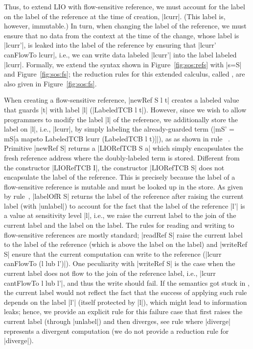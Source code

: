 Thus, to extend LIO with flow-sensitive reference, we must account for the label
on the label of the reference at the time of creation, |lcurr|.
%
(This label is, however, immutable.)
%
In turn, when changing the label of the reference, we must ensure that no data
from the context at the time of the change, whose label is |lcurr'|, is leaked
into the label of the reference by ensuring that |lcurr' canFlowTo lcurr|,
i.e., we can write data labeled |lcurr'| into the label labeled |lcurr|.
%
Formally, we extend the \lio{} syntax shown in Figure~\ref{fig:sos:refs}
with |s=S| and Figure~\ref{fig:sos:fs};
%
the reduction rules for this extended calculus, called \liofs{}, are also
given in Figure~\ref{fig:sos:fs}.

When creating a flow-sensitive reference, |newRef S l t| creates a labeled
value that guards |t| with label |l| (|LabeledTCB l t|).
%
However, since we wish to allow programmers to modify the label |l| of the
reference, we additionally store the label on |l|, i.e., |lcurr|, by simply
labeling the already-guarded term (|mS' = mS[a mapsto LabeledTCB lcurr
(LabeledTCB l t)]|), as as shown in rule~ .
%
Primitive |newRef S| returns a |LIORefTCB S a| which simply encapsulates the fresh
reference address where the doubly-labeled term is stored.
%
Different from the constructor |LIORefTCB I|,  the constructor |LIORefTCB S|
does not encapsulate the label of the reference. 
%
This is precisely because the label of a flow-sensitive reference is 
mutable and must be looked up in the store.
%
As given by rule~, |labelOfR S| returns the label of the
reference after raising the current label (with |unlabel|) to account for the
fact that the label of the reference |l'| is a value at sensitivity level |l|,
i.e., we raise the current label to the join of the current label and the label
on the label.
%
The rules for reading and writing to flow-sensitive references are mostly
standard; |readRef S| raise the current label to the label of the reference
(which is above the label on the label) and |writeRef S| ensure that the
current computation can write to the reference (|lcurr canFlowTo (l lub l')|).
%
One peculiarity with |writeRef S| is the case when the current label does not
flow to the join of the reference label, i.e., |lcurr cantFlowTo l lub l'|, and
thus the write should fail.
%
If the semantics got stuck in , the current label would
not reflect the fact that the success of applying such rule depends on the
label |l'| (itself protected by |l|), which might lead to information leaks;
hence, we provide an explicit rule for this failure case that first raises the
current label (through |unlabel|) and then diverges, see rule
 where |diverge| represents a divergent computation
(we do not provide a reduction rule for |diverge|).

